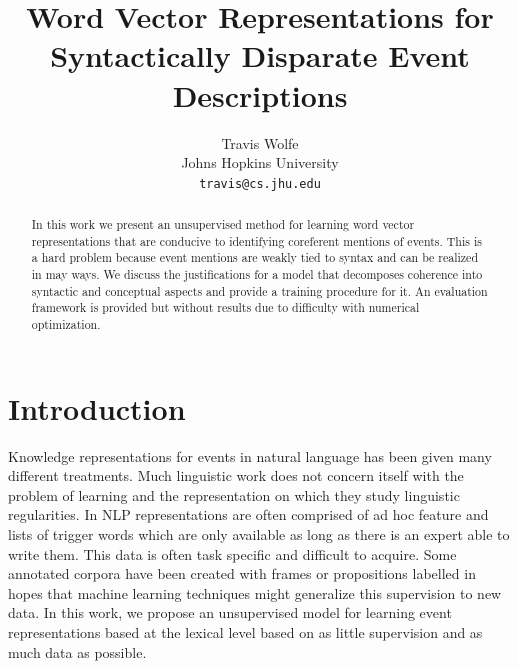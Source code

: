 \documentclass[11pt,letterpaper]{article}
\title{Word Vector Representations for \\
Syntactically Disparate Event Descriptions}
\author{Travis Wolfe\\
	    Johns Hopkins University \\
	    {\tt travis@cs.jhu.edu}
}
\date{}
\begin{document}
\maketitle
\begin{abstract}
In this work we present an unsupervised method for
learning word vector representations that are conducive to
identifying coreferent mentions of events.
This is a hard problem because event mentions are weakly
tied to syntax and can be realized in may ways.
We discuss the justifications for a model that decomposes
coherence into syntactic and conceptual aspects and
provide a training procedure for it.
An evaluation framework is provided but without results due
to difficulty with numerical optimization.
\end{abstract}



\section{Introduction}
Knowledge representations for events in natural language has been given many different treatments.
Much linguistic work does not concern itself with the problem of learning and
the representation on which they study linguistic regularities.
In NLP representations are often comprised of ad hoc feature and lists of
trigger words which are only available as long as there is an expert able to write them.
This data is often task specific and difficult to acquire.
Some annotated corpora have been created with frames or propositions labelled
in hopes that machine learning techniques might generalize this supervision to new data.
In this work, we propose an unsupervised model for learning event representations
based at the lexical level based on as little supervision and as much data
as possible.
\end{document}
